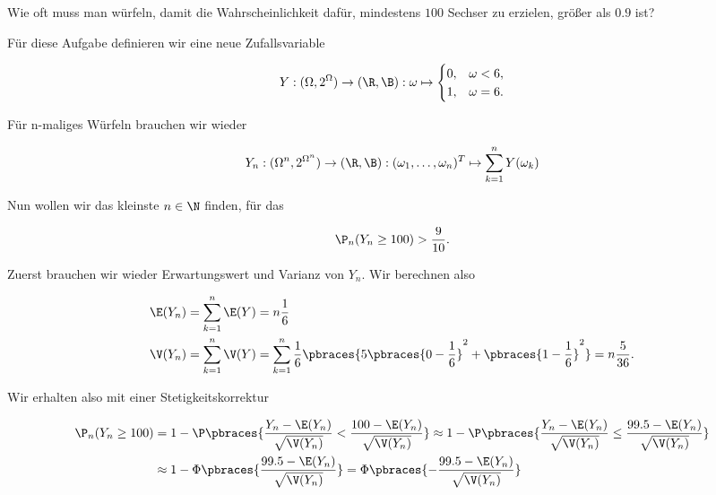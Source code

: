\begin{exercise}

Wie oft muss man würfeln, damit die Wahrscheinlichkeit dafür, mindestens $100$ Sechser zu erzielen, größer als $0.9$ ist?

\end{exercise}

\begin{solution}

Für diese Aufgabe definieren wir eine neue Zufallsvariable

\begin{align*}
    Y:(\Omega,2^\Omega) \to (\R,\B): \omega \mapsto
    \begin{cases}
        0, & \omega < 6, \\
        1, & \omega = 6.
    \end{cases}
\end{align*}

Für n-maliges Würfeln brauchen wir wieder

\begin{align*}
    Y_n:(\Omega^n,2^{\Omega^n}) \to (\R, \B): (\omega_1,\dots,\omega_n)^T \mapsto \sum_{k=1}^n Y(\omega_k)
\end{align*}

Nun wollen wir das kleinste $n \in \N$ finden, für das

\begin{align*}
    \P_n(Y_n \geq 100) > \frac{9}{10}.
\end{align*}

Zuerst brauchen wir wieder Erwartungswert und Varianz von $Y_n$. Wir berechnen also

\begin{align*}
    \E(Y_n) &= \sum_{k=1}^n\E(Y) = n\frac{1}{6} \\
    \V(Y_n) &= \sum_{k=1}^n\V(Y) = \sum_{k=1}^n \frac{1}{6}\pbraces{5\pbraces{0-\frac{1}{6}}^2 + \pbraces{1-\frac{1}{6}}^2} = n\frac{5}{36}.
\end{align*}

Wir erhalten also mit einer Stetigkeitskorrektur

\begin{align*}
    \P_n(Y_n \geq 100) &= 1 - \P\pbraces{\frac{Y_n-\E(Y_n)}{\sqrt{\V(Y_n)}} < \frac{100-\E(Y_n)}{\sqrt{\V(Y_n)}}} \approx 1 - \P\pbraces{\frac{Y_n-\E(Y_n)}{\sqrt{\V(Y_n)}} \leq \frac{99.5-\E(Y_n)}{\sqrt{\V(Y_n)}}} \\
    &\approx 1 - \Phi\pbraces{\frac{99.5-\E(Y_n)}{\sqrt{\V(Y_n)}}} = \Phi\pbraces{-\frac{99.5-\E(Y_n)}{\sqrt{\V(Y_n)}}}
\end{align*}


\end{solution}
